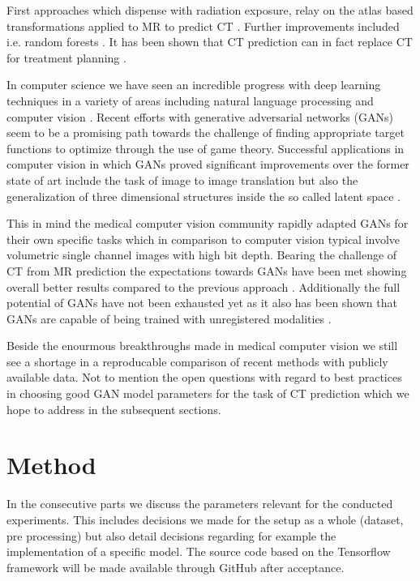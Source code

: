 \documentclass[
  a4paper,
  abstracton,
  emulatestandardclasses,
]{scrartcl}
\begin{document}
First approaches which dispense with radiation exposure, relay on the
atlas based transformations applied to MR to predict CT \cite{Hofmann08}.
Further improvements included i.e. random forests \cite{Andreasen13}.
It has been shown that CT prediction can in fact replace CT for treatment
planning \cite{Andreasen2017}.

In computer science we have seen an incredible progress with
deep learning techniques in a variety of areas including natural language
processing and computer vision \cite{LeCun15}. Recent efforts with generative
adversarial networks (GANs) \cite{Goodfellow14} seem to be a promising
path towards the challenge of finding appropriate target functions to optimize
through the use of game theory. Successful applications in computer vision
in which GANs proved significant improvements over the former state of art
include the task of image to image translation \cite{Isola16} but also the
generalization of three dimensional structures inside the so called latent
space \cite{ZXFT16}.

This in mind the medical computer vision community rapidly adapted
GANs for their own specific tasks which in comparison to computer
vision typical involve volumetric single channel images with high bit depth.
Bearing the challenge of CT from MR prediction the expectations towards GANs
have been met showing overall better results compared to the previous
approach \cite{Nie16}. Additionally the full potential of GANs have not
been exhausted yet as it also has been shown that GANs are capable of
being trained with unregistered modalities \cite{Wolterink17}.

Beside the enourmous breakthroughs made in medical computer vision we still
see a shortage in a reproducable comparison of recent methods with publicly
available data. Not to mention the open questions with regard to best
practices in choosing good GAN model parameters for the task of CT prediction
which we hope to address in the subsequent sections.

\section{Method}

In the consecutive parts we discuss the parameters relevant for the conducted
experiments. This includes decisions we made for the setup as a whole
(dataset, pre processing) but also detail decisions regarding for example
the implementation of a specific model. The source code based on the
Tensorflow framework \cite{tensorflow15} will be made available through
GitHub after acceptance.
\end{document}
